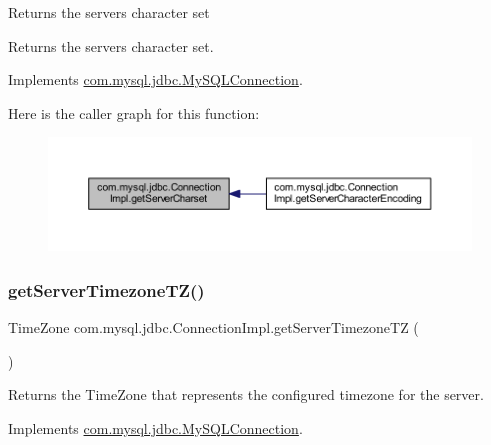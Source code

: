 Returns the server\textquotesingle{}s character set

\begin{DoxyReturn}{Returns}
the server\textquotesingle{}s character set. 
\end{DoxyReturn}


Implements \mbox{\hyperlink{interfacecom_1_1mysql_1_1jdbc_1_1_my_s_q_l_connection_a4f921d9cf354764fd1241cd56c0abecb}{com.\+mysql.\+jdbc.\+My\+S\+Q\+L\+Connection}}.

Here is the caller graph for this function\+:\nopagebreak
\begin{figure}[H]
\begin{center}
\leavevmode
\includegraphics[width=350pt]{classcom_1_1mysql_1_1jdbc_1_1_connection_impl_aec1bc6ca740ae9b75d6cad0f3126a276_icgraph}
\end{center}
\end{figure}
\mbox{\label{classcom_1_1mysql_1_1jdbc_1_1_connection_impl_ac1fa3018d7b3c139355f45e55f37fd15}} 
\subsubsection{\texorpdfstring{get\+Server\+Timezone\+T\+Z()}{getServerTimezoneTZ()}}
{\footnotesize\ttfamily Time\+Zone com.\+mysql.\+jdbc.\+Connection\+Impl.\+get\+Server\+Timezone\+TZ (\begin{DoxyParamCaption}{ }\end{DoxyParamCaption})}

Returns the Time\+Zone that represents the configured timezone for the server. 

Implements \mbox{\hyperlink{interfacecom_1_1mysql_1_1jdbc_1_1_my_s_q_l_connection_a28586f911062106cb730733427568fc7}{com.\+mysql.\+jdbc.\+My\+S\+Q\+L\+Connection}}.

